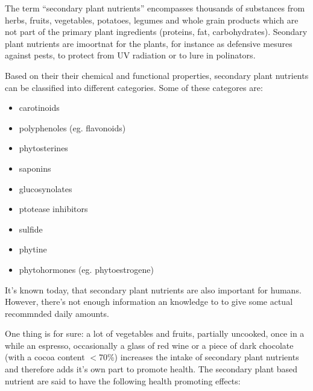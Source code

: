 \documentclass[../main.tex]{subfiles}
\begin{document}
The term ``secondary plant nutrients'' encompasses thousands of substances from herbs, fruits, vegetables,
potatoes, legumes and whole grain products which are not part of the primary plant ingredients (proteins, fat, carbohydrates).
Seondary plant nutrients are imoortnat for the plants, for instance as defensive mesures against pests,
to protect from UV radiation or to lure in polinators.


Based on their their chemical and functional properties, secondary plant nutrients can be classified into different categories.
Some of these categores are:
\begin{itemize}
\item carotinoids
\item polyphenoles (eg. flavonoids)
\item phytosterines
\item saponins
\item glucosynolates
\item ptotease inhibitors
\item sulfide
\item phytine
  \item phytohormones (eg. phytoestrogene)
  \end{itemize}

  It's known today, that secondary plant nutrients are also important for humans.
  However, there's not enough information an knowledge to to give some actual recommnded daily amounts.

  One thing is for sure: a lot of vegetables and fruits, partially uncooked, once in a while an espresso, occasionally a glass of red wine
  or a piece of dark chocolate (with a cocoa content $<$70\%) increases the intake of secondary plant nutrients
  and therefore adds it's own part to promote health.
  The secondary plant based nutrient are said to have the following health promoting effects:
\end{document}

